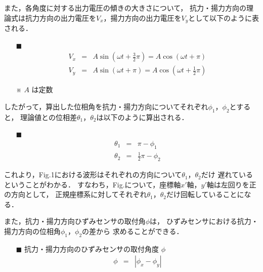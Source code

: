 \documentclass[twocolumn,a4j]{jsarticle}
\begin{document}
また，各角度に対する出力電圧の傾きの大きさについて，
抗力・揚力方向の理論式は抗力方向の出力電圧を$V_{x}$，揚力方向の出力電圧を$V_{y}$として以下のように表される．

\begin{itemize}
    \item [$\blacksquare$] 
    \begin{eqnarray*}
        V_{x} &=& A \sin\left(\omega t + \frac{3}{2}\pi\right) = A \cos\left(\omega t + \pi\right)\\
        V_{y} &=& A \sin\left(\omega t + \pi\right) = A \cos\left(\omega t + \frac{1}{2}\pi\right)
    \end{eqnarray*}
    \item [※] $A$ は定数
\end{itemize}

したがって，算出した位相角を抗力・揚力方向についてそれぞれ$\phi_1$，$\phi_2$とすると，
理論値との位相差$\theta_1$，$\theta_2$は以下のように算出される．

\begin{itemize}
    \item [$\blacksquare$] 
    \begin{eqnarray*}
        \theta_1 &=& \pi - \phi_1\\
        \theta_2 &=& \frac{1}{2} \pi - \phi_2
    \end{eqnarray*}
\end{itemize}

これより，Fig.1における波形はそれぞれの方向について$\theta_1$，$\theta_2$だけ
遅れているということがわかる．
すなわち，Fig.について，座標軸$x'$軸，$y'$軸は左回りを正の方向として，
正規座標系に対してそれぞれ$\theta_1$，$\theta_2$だけ回転していることになる．\par

また，抗力・揚力方向ひずみセンサの取付角$\phi$は，
ひずみセンサにおける抗力・揚力方向の位相角$\phi_1$，$\phi_2$の差から
求めることができる．

\begin{itemize}
    \item [$\blacksquare$] 抗力・揚力方向のひずみセンサの取付角度 $\phi$
    \begin{eqnarray*}
        \phi &=& \left| \phi_x - \phi_y \right| \\
    \end{eqnarray*}    
\end{itemize}
\end{document}
